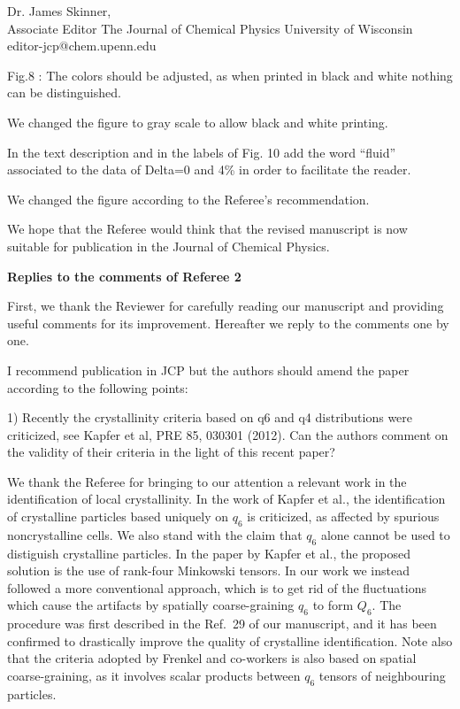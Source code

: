 \documentclass[a4paper, rebuttal, parskip=true, firsthead=false, fromemail=false, foldmarks=false]{scrlttr2}
\begin{document}
\begin{letter}{Dr. James Skinner,\\Associate Editor
The Journal of Chemical Physics
University of Wisconsin\\
editor-jcp@chem.upenn.edu }
\begin{quotationi}
Fig.8 : The colors should be adjusted, as when printed in black and white nothing can be distinguished.
\end{quotationi}
We changed the figure to gray scale to allow black and white printing.

\begin{quotationi}
In the text description and in the labels of Fig. 10 add the word ``fluid'' associated to the data of Delta=0 and 4\% in order to facilitate the reader.
\end{quotationi}
We changed the figure according to the Referee's recommendation.

We hope that the Referee would think that the revised manuscript is now suitable for publication in the Journal of Chemical Physics. 

\clearpage

\textsf{\textbf{Replies to the comments of Referee 2}}

First, we thank the Reviewer for carefully reading our manuscript and providing useful comments for its improvement. 
Hereafter we reply to the comments one by one.

\begin{quotationi}

I recommend publication in JCP but the authors should amend the paper
according to the following points:

1) Recently the crystallinity criteria based on q6 and q4 distributions
were criticized, see Kapfer et al, PRE 85, 030301 (2012). Can the authors
comment on the validity of their criteria in the light of this recent paper?
\end{quotationi}

We thank the Referee for bringing to our attention a relevant work in the identification of
local crystallinity. In the work of Kapfer et al., the identification of crystalline
particles based uniquely on $q_6$ is criticized, as affected by spurious noncrystalline cells.
We also stand with the claim that $q_6$ alone cannot be used to distiguish crystalline particles. In the
paper by Kapfer et al., the proposed solution is the use of rank-four Minkowski tensors. In our work
we instead followed a more conventional approach, which is to get rid of the fluctuations which
cause the artifacts by spatially coarse-graining $q_6$ to form $Q_6$. The procedure was first
described in the Ref.~29 of our manuscript, and it has been confirmed to drastically improve the
quality of crystalline identification. Note also that the criteria adopted by Frenkel and co-workers
is also based on spatial coarse-graining, as it involves scalar products between $q_6$ tensors of
neighbouring particles.


\end{letter}
\end{document}
